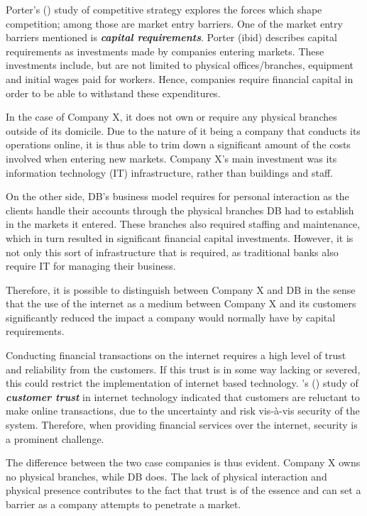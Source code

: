\documentclass[11pt,a4paper]{article}
\begin{document}
{{{ Porter's (\citeyear{porterCompetitiveStrategyTechniques1980}) study of competitive strategy explores the forces which shape competition; among those are market entry barriers. One of the market entry barriers mentioned is \textbf{\textit{capital requirements}}. Porter (ibid) describes capital requirements as investments made by companies entering markets. These investments include, but are not limited to physical offices/branches, equipment and initial wages paid for workers. Hence, companies require financial capital in order to be able to withstand these expenditures. \par
In the case of Company X, it does not own or require any physical branches outside of its domicile. Due to the nature of it being a company that conducts its operations online, it is thus able to trim down a significant amount of the costs involved when entering new markets. Company X's main investment was its information technology (IT) infrastructure, rather than buildings and staff.  \par
On the other side, DB's business model requires for personal interaction as the clients handle their accounts through the physical branches DB had to establish in the markets it entered. These branches also required staffing and maintenance, which in turn resulted in significant financial capital investments. However, it is not only this sort of infrastructure that is required, as traditional banks also require IT for managing their business. \par
Therefore, it is possible to distinguish between Company X and DB in the sense that the use of the internet as a medium between Company X and its customers significantly reduced the impact a company would normally have by capital requirements. \par

Conducting financial transactions on the internet requires a high level of trust and reliability from the customers. If this trust is in some way lacking or severed, this could restrict the implementation of internet based technology. \citeauthor{leeTrustModelConsumer2001}'s (\citeyear{leeTrustModelConsumer2001}) study of \textbf{\textit{customer trust}} in internet technology indicated that customers are reluctant to make online transactions, due to the uncertainty and risk vis-à-vis security of the system. Therefore, when providing financial services over the internet, security is a prominent challenge. \par
The difference between the two case companies is thus evident. Company X owns no physical branches, while DB does. The lack of physical interaction and physical presence contributes to the fact that trust is of the essence and can set a barrier as a company attempts to penetrate a market. \par

}}}
\end{document}

